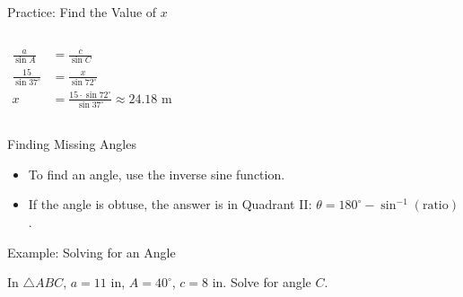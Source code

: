 \documentclass[aspectratio=169]{beamer}
\begin{document}
\begin{frame}{Practice: Find the Value of $x$}
    \begin{tcolorbox}[colback=lightgray,colframe=accent,title=Solution]
        \footnotesize
        \begin{columns}
            \begin{align*}
                \frac{a}{\sin A} &= \frac{c}{\sin C} \\
                \frac{15}{\sin 37^\circ} &= \frac{x}{\sin 72^\circ} \\
                x &= \frac{15 \cdot \sin 72^\circ}{\sin 37^\circ} \approx 24.18 \text{ m}
            \end{align*}
        \end{columns}
    \end{tcolorbox}
\end{frame}

\begin{frame}{Finding Missing Angles}
    \begin{tcolorbox}[colback=lightgray,colframe=primary,title=Finding Angles with Sine Law]
        \footnotesize
        \begin{itemize}
            \item To find an angle, use the inverse sine function.
            \item If the angle is obtuse, the answer is in Quadrant II: $\theta = 180^\circ - \sin^{-1}(\text{ratio})$.
        \end{itemize}
    \end{tcolorbox}
\end{frame}

\begin{frame}{Example: Solving for an Angle}
    \begin{tcolorbox}[colback=lightgray,colframe=primary,title=Question]
        \footnotesize
        In $\triangle ABC$, $a = 11$ in, $A = 40^\circ$, $c = 8$ in. Solve for angle $C$.
    \end{tcolorbox}
\end{frame}
\end{document}
